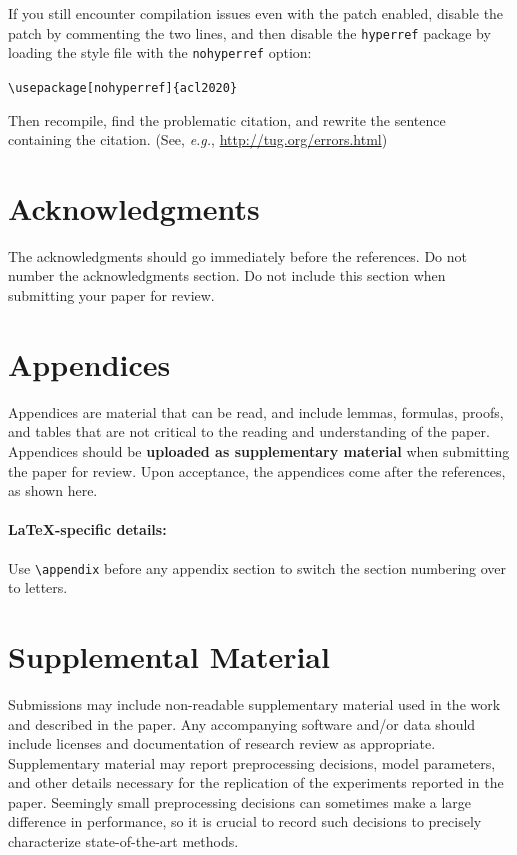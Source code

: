 \documentclass[11pt,a4paper]{article}
\begin{document}
If you still encounter compilation issues even with the patch enabled, disable the patch by commenting the two lines, and then disable the \texttt{\small hyperref} package by loading the style file with the \texttt{\small nohyperref} option:

\noindent
{\small\verb|\usepackage[nohyperref]{acl2020}|}

\noindent
Then recompile, find the problematic citation, and rewrite the sentence containing the citation. (See, {\em e.g.}, \url{http://tug.org/errors.html})

\section*{Acknowledgments}

The acknowledgments should go immediately before the references. Do not number the acknowledgments section.
Do not include this section when submitting your paper for review.




\appendix

\section{Appendices}
\label{sec:appendix}
Appendices are material that can be read, and include lemmas, formulas, proofs, and tables that are not critical to the reading and understanding of the paper.
Appendices should be \textbf{uploaded as supplementary material} when submitting the paper for review.
Upon acceptance, the appendices come after the references, as shown here.

\paragraph{\LaTeX-specific details:}
Use {\small\verb|\appendix|} before any appendix section to switch the section numbering over to letters.


\section{Supplemental Material}
\label{sec:supplemental}
Submissions may include non-readable supplementary material used in the work and described in the paper.
Any accompanying software and/or data should include licenses and documentation of research review as appropriate.
Supplementary material may report preprocessing decisions, model parameters, and other details necessary for the replication of the experiments reported in the paper.
Seemingly small preprocessing decisions can sometimes make a large difference in performance, so it is crucial to record such decisions to precisely characterize state-of-the-art methods.
\end{document}

